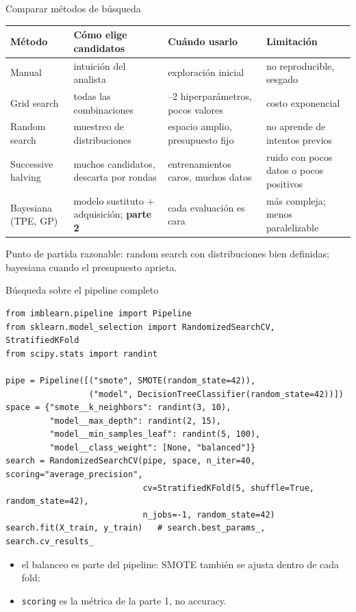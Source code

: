 \documentclass[aspectratio=169,12pt]{beamer}
\newcommand{\hrow}{\rowcolor{mlcream}}
\begin{document}
\begin{frame}{Comparar métodos de búsqueda}
  \centering\scriptsize
  \begin{tabularx}{\textwidth}{@{}l >{\raggedright\arraybackslash}X >{\raggedright\arraybackslash}X >{\raggedright\arraybackslash}X@{}}
    \toprule
    \hrow \textbf{Método} & Cómo elige candidatos & Cuándo usarlo & Limitación \\
    \midrule
    Manual & intuición del analista & exploración inicial & no reproducible, sesgado \\
    Grid search & todas las combinaciones & 1--2 hiperparámetros, pocos valores & costo exponencial \\
    Random search & muestreo de distribuciones & espacio amplio, presupuesto fijo & no aprende de intentos previos \\
    Successive halving & muchos candidatos, descarta por rondas & entrenamientos caros, muchos datos & ruido con pocos datos o pocos positivos \\
    Bayesiana (TPE, GP) & modelo sustituto + adquisición; \textbf{parte 2} & cada evaluación es cara & más compleja; menos paralelizable \\
    \bottomrule
  \end{tabularx}
  \vspace{4pt}
  \raggedright\footnotesize Punto de partida razonable: random search con distribuciones bien definidas; bayesiana cuando el presupuesto aprieta.
\end{frame}

\begin{frame}[fragile]{Búsqueda sobre el pipeline completo}
\begin{lstlisting}[basicstyle=\ttfamily\scriptsize,columns=fullflexible,keepspaces=true,xleftmargin=12pt]
from imblearn.pipeline import Pipeline
from sklearn.model_selection import RandomizedSearchCV, StratifiedKFold
from scipy.stats import randint

pipe = Pipeline([("smote", SMOTE(random_state=42)),
                 ("model", DecisionTreeClassifier(random_state=42))])
space = {"smote__k_neighbors": randint(3, 10),
         "model__max_depth": randint(2, 15),
         "model__min_samples_leaf": randint(5, 100),
         "model__class_weight": [None, "balanced"]}
search = RandomizedSearchCV(pipe, space, n_iter=40, scoring="average_precision",
                            cv=StratifiedKFold(5, shuffle=True, random_state=42),
                            n_jobs=-1, random_state=42)
search.fit(X_train, y_train)   # search.best_params_, search.cv_results_
\end{lstlisting}
  \small
  \begin{itemize}
    \item el balanceo es parte del pipeline: SMOTE también se ajusta dentro de cada fold;
    \item \texttt{scoring} es la métrica de la parte 1, no accuracy.
  \end{itemize}
\end{frame}
\end{document}
